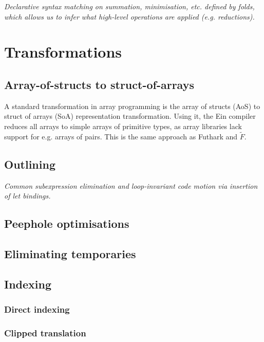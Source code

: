 \textit{Declarative syntax matching on summation, minimisation, etc. defined by folds, which allows us to infer what high-level operations are applied (e.g. reductions).} \todothis

\section{Transformations}

\subsection{Array-of-structs to struct-of-arrays}

A standard transformation in array programming is the array of structs (AoS) to struct of arrays (SoA) representation transformation. Using it, the Ein compiler reduces all arrays to simple arrays of primitive types, as array libraries lack support for e.g. arrays of pairs. This is the same approach as Futhark and $\tilde F$. \todothis

\subsection{Outlining}

\textit{Common subexpression elimination and loop-invariant code motion via insertion of let bindings.} \todothis

\subsection{Peephole optimisations}

\subsection{Eliminating temporaries}

\subsection{Indexing}

\subsubsection{Direct indexing}

\subsubsection{Clipped translation}

